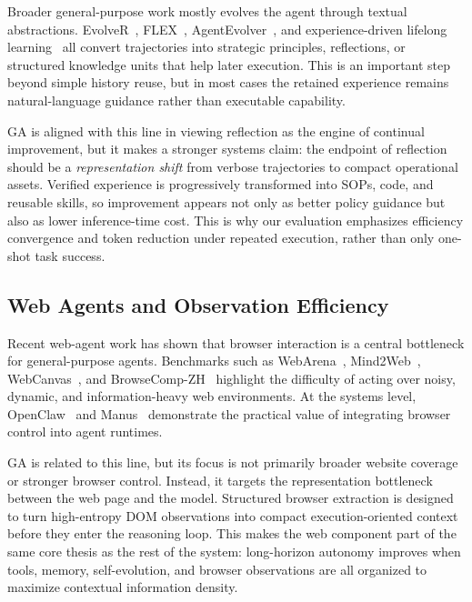 Broader general-purpose work mostly evolves the agent through textual abstractions. EvolveR~\citep{evolver}, FLEX~\citep{flex}, AgentEvolver~\citep{agentevolver}, and experience-driven lifelong learning~\citep{selfevolvinglifelong} all convert trajectories into strategic principles, reflections, or structured knowledge units that help later execution. This is an important step beyond simple history reuse, but in most cases the retained experience remains natural-language guidance rather than executable capability.

GA is aligned with this line in viewing reflection as the engine of continual improvement, but it makes a stronger systems claim: the endpoint of reflection should be a \emph{representation shift} from verbose trajectories to compact operational assets. Verified experience is progressively transformed into SOPs, code, and reusable skills, so improvement appears not only as better policy guidance but also as lower inference-time cost. This is why our evaluation emphasizes efficiency convergence and token reduction under repeated execution, rather than only one-shot task success.

\subsection{Web Agents and Observation Efficiency}
\label{sec:related_web_agents}

Recent web-agent work has shown that browser interaction is a central bottleneck for general-purpose agents. Benchmarks such as WebArena~\citep{webarena}, Mind2Web~\citep{mind2web}, WebCanvas~\citep{webcanvas}, and BrowseComp-ZH~\citep{browsecomp_zh} highlight the difficulty of acting over noisy, dynamic, and information-heavy web environments. At the systems level, OpenClaw~\citep{openclaw_rl} and Manus~\citep{manus} demonstrate the practical value of integrating browser control into agent runtimes.

GA is related to this line, but its focus is not primarily broader website coverage or stronger browser control. Instead, it targets the representation bottleneck between the web page and the model. Structured browser extraction is designed to turn high-entropy DOM observations into compact execution-oriented context before they enter the reasoning loop. This makes the web component part of the same core thesis as the rest of the system: long-horizon autonomy improves when tools, memory, self-evolution, and browser observations are all organized to maximize contextual information density.
